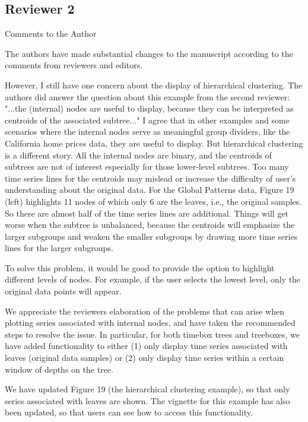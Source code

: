 \documentclass{article}
\begin{document}
\color{black}

\subsection{Reviewer 2}
\label{subsec:reviewer_2}

\color{blue}
Comments to the Author

The authors have made substantial changes to the manuscript according to the
comments from reviewers and editors.

However, I still have one concern about the display of hierarchical clustering.
The authors did answer the question about this example from the second reviewer:
"...the (internal) nodes are useful to display, because they can be interpreted
as centroids of the associated subtree..." I agree that in other examples and
some scenarios where the internal nodes serve as meaningful group dividers, like
the California home prices data, they are useful to display. But hierarchical
clustering is a different story. All the internal nodes are binary, and the
centroids of subtrees are not of interest especially for those lower-level
subtrees. Too many time series lines for the centroids may mislead or increase
the difficulty of user's understanding about the original data. For the Global
Patterns data, Figure 19 (left) highlights 11 nodes of which only 6 are the
leaves, i.e., the original samples. So there are almost half of the time series
lines are additional. Things will get worse when the subtree is unbalanced,
because the centroids will emphasize the larger subgroups and weaken the smaller
subgroups by drawing more time series lines for the larger subgroups.

To solve this problem, it would be good to provide the option to highlight
different levels of nodes. For example, if the user selects the lowest level,
only the original data points will appear.

\color{black}
We appreciate the reviewers elaboration of the problems that can arise when
plotting series associated with internal nodes, and have taken the recommended
steps to resolve the issue. In particular, for both timebox trees and treeboxes,
we have added functionality to either (1) only display time series associated
with leaves (original data samples) or (2) only display time series within a
certain window of depths on the tree.

We have updated Figure 19 (the hierarchical clustering example), so that only
series associated with leaves are shown. The vignette for this example has also
been updated, so that users can see how to access this functionality.
\end{document}
